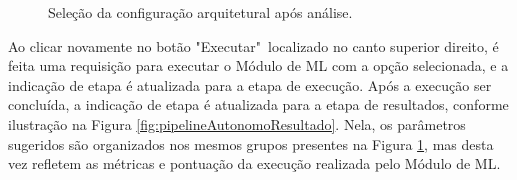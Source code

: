 \documentclass[portugues]{ic-tese}
\begin{document}
\begin{figure}[H]
    \centering
    \caption{Seleção da configuração arquitetural após análise.}
    \label{fig:pipelineAutonomoSelecao}
\end{figure}

Ao clicar novamente no botão "Executar"~localizado no canto superior direito, é feita uma requisição para executar o Módulo de ML com a opção selecionada, e a indicação de etapa é atualizada para a etapa de execução. Após a execução ser concluída,  a indicação de etapa é atualizada para a etapa de resultados, conforme ilustração na Figura \ref{fig:pipelineAutonomoResultado}. Nela, os parâmetros sugeridos são organizados nos mesmos grupos presentes na Figura \ref{fig:pipelineAutonomoSelecao}, mas desta vez refletem as métricas e pontuação da execução realizada pelo Módulo de ML.
\end{document}
